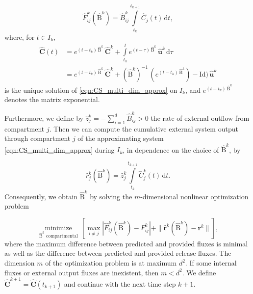 \documentclass[draft]{agujournal2019}
\renewcommand{\vec}[1]{\mathbf{#1}}
\newcommand{\tens}[1]{\mathrm{#1}}
\newcommand{\id}{\tens{Id}}
\newcommand{\dd}[1]{\,\mathrm{d}#1}
\newcommand{\intl}{\int\limits}
\begin{document}
        \begin{equation*}
            \widehat{F}^k_{ij}(\widehat{\tens{B}}^k) = \widehat{B}^k_{ij}\intl_{t_k}^{t_{k+1}} \widehat{C}_j(t)\dd{t},
        \end{equation*}
        where, for $t\in I_k$,
        \begin{align*}
            \widehat{\vec{C}}(t) &= e^{(t-t_k)\,\widehat{\tens{B}}^k}\,\widehat{\vec{C}}^k + \intl_{t_k}^t e^{(t-\tau)\,\widehat{\tens{B}}^k}\,\widehat{\vec{u}}^k\dd{\tau}\\
            &= e^{(t-t_k)\,\widehat{\tens{B}}^k}\,\widehat{\vec{C}}^k + (\widehat{\tens{B}}^k)^{-1}\,(e^{(t-t_k)\,\widehat{\tens{B}}^k})-\id)\,\widehat{\vec{u}}^k
        \end{align*}
        is the unique solution of \eqref{eqn:CS_multi_dim_approx} on $I_k$, and $e^{(t-t_k)\,\widehat{\tens{B}}^k}$ denotes the matrix exponential.

        Furthermore, we define by $\widehat{z}^k_j=-\sum_{i=1}^d \widehat{B}^k_{ij}>0$ the rate of external outflow from compartment $j$.
        Then we can compute the cumulative external system output through compartment $j$ of the approximating system \eqref{eqn:CS_multi_dim_approx} during $I_k$, in dependence on the choice of $\widehat{\tens{B}}^k$, by
        
        \begin{equation*}
            \widehat{r}^k_j(\widehat{\tens{B}}^k) = \widehat{z}^k_j\intl_{t_k}^{t_{k+1}} \widehat{C}^k_j(t)\dd{t}.
        \end{equation*}
        Consequently, we obtain $\widehat{\tens{B}}^k$ by solving the $m$-dimensional nonlinear optimization problem
        
        \begin{equation*}
            \underset{\widehat{\tens{B}}^k\text{ compartmental}}{\operatorname{minimize}}\,\left[\max\limits_{i\neq j} |\widehat{F}^k_{ij}(\widehat{\tens{B}}^k)-F^k_{ij}| + \|\widehat{\vec{r}}^k(\widehat{\tens{B}}^k)-\vec{r}^k \| \right],
        \end{equation*}
        where the maximum difference between predicted and provided fluxes is minimal as well as the difference between predicted and provided release fluxes. 
        The dimension $m$ of the optimization problem is at maximum $d^2$.
        If some internal fluxes or external output fluxes are inexistent, then $m<d^2$.
        We define $\widehat{\vec{C}}^{k+1}=\widehat{\vec{C}}(t_{k+1})$ and continue with the next time step $k+1$.\\
       
\end{document}
